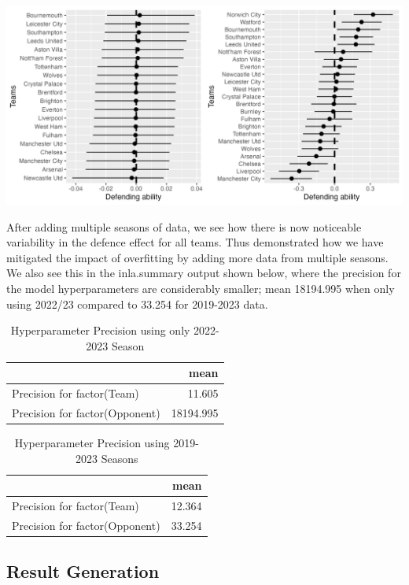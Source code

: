 \documentclass[
]{article}
\begin{document}
\includegraphics[width=0.9\linewidth,height=0.9\textheight]{allvssingledefprem}

After adding multiple seasons of data, we see how there is now
noticeable variability in the defence effect for all teams. Thus
demonstrated how we have mitigated the impact of overfitting by adding
more data from multiple seasons. We also see this in the inla.summary
output shown below, where the precision for the model hyperparameters
are considerably smaller; mean 18194.995 when only using 2022/23
compared to 33.254 for 2019-2023 data.

\begin{table}

\caption{\label{tab:premallsinglesumcomp}Hyperparameter Precision using only 2022-2023 Season}
\centering
\begin{tabular}[t]{l|r}
\hline
  & mean\\
\hline
Precision for factor(Team) & 11.605\\
\hline
Precision for factor(Opponent) & 18194.995\\
\hline
\end{tabular}
\end{table}

\begin{table}

\caption{\label{tab:premallsinglesumcomp}Hyperparameter Precision using 2019-2023 Seasons}
\centering
\begin{tabular}[t]{l|r}
\hline
  & mean\\
\hline
Precision for factor(Team) & 12.364\\
\hline
Precision for factor(Opponent) & 33.254\\
\hline
\end{tabular}
\end{table}

\hypertarget{result-generation}{%
\subsection{Result Generation}\label{result-generation}}
\end{document}
